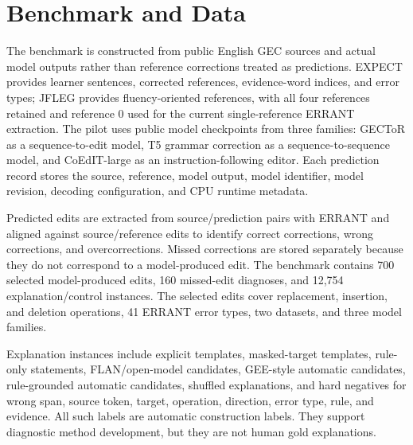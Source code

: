 \section{Benchmark and Data}

The benchmark is constructed from public English GEC sources and actual model outputs rather than reference corrections treated as predictions. EXPECT provides learner sentences, corrected references, evidence-word indices, and error types; JFLEG provides fluency-oriented references, with all four references retained and reference 0 used for the current single-reference ERRANT extraction. The pilot uses public model checkpoints from three families: GECToR as a sequence-to-edit model, T5 grammar correction as a sequence-to-sequence model, and CoEdIT-large as an instruction-following editor. Each prediction record stores the source, reference, model output, model identifier, model revision, decoding configuration, and CPU runtime metadata.




Predicted edits are extracted from source/prediction pairs with ERRANT and aligned against source/reference edits to identify correct corrections, wrong corrections, and overcorrections. Missed corrections are stored separately because they do not correspond to a model-produced edit. The benchmark contains 700 selected model-produced edits, 160 missed-edit diagnoses, and 12,754 explanation/control instances. The selected edits cover replacement, insertion, and deletion operations, 41 ERRANT error types, two datasets, and three model families.



Explanation instances include explicit templates, masked-target templates, rule-only statements, FLAN/open-model candidates, GEE-style automatic candidates, rule-grounded automatic candidates, shuffled explanations, and hard negatives for wrong span, source token, target, operation, direction, error type, rule, and evidence. All such labels are automatic construction labels. They support diagnostic method development, but they are not human gold explanations.
